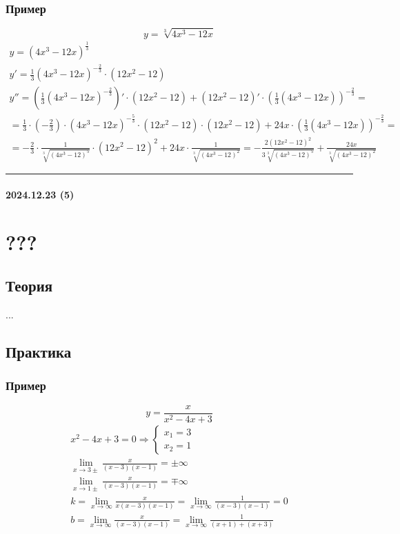 \documentclass{article}
\begin{document}
\subsubsection{Пример}
\[
    y = \sqrt[3]{4x^3 - 12x}
\]
\begin{gather*}
    y = (4x^3 - 12x)^{\frac{1}{3}} \\
    y' = \frac{1}{3} (4x^3 - 12x)^{-\frac{2}{3}} \cdot (12x^2 - 12) \\
    y'' = \left(\frac{1}{3} (4x^3 - 12x)^{-\frac{2}{3}}\right)' \cdot (12x^2 - 12) + 
    (12x^2 - 12)' \cdot \left(\frac{1}{3} (4x^3 - 12x)\right)^{-\frac{2}{3}} = \\
    = \frac{1}{3} \cdot \left( -\frac{2}{3} \right) \cdot (4x^3 - 12x)^{-\frac{5}{3}} \cdot (12x^2 - 12) \cdot (12x^2 - 12) +
    24x \cdot \left(\frac{1}{3} (4x^3 - 12x)\right)^{-\frac{2}{3}} = \\
    = -\frac{2}{3} \cdot \frac{1}{\sqrt[3]{(4x^3 - 12)^5}} \cdot (12x^2 - 12)^2 + 24x \cdot \frac{1}{\sqrt[3]{(4x^3 - 12)^2}} =
    -\frac{2(12x^2 - 12)^2}{3\sqrt[3]{(4x^3 - 12)^5}} + \frac{24x}{\sqrt[3]{(4x^3 - 12)^2}}
\end{gather*}



\par\noindent\rule{\textwidth}{1pt}
\paragraph{2024.12.23 (5)}
\section{???}

\subsection{Теория}
...

\subsection{Практика}

\subsubsection{Пример}
\[
    y = \frac{x}{x^2 - 4x + 3}
\]
\begin{gather*}
    x^2 - 4x + 3 = 0 \Rightarrow
    \begin{cases}
        x_1 = 3 \\
        x_2 = 1
    \end{cases} \\
    \lim_{x \to 3\pm} \frac{x}{(x - 3)(x - 1)} = \pm \infty \\
    \lim_{x \to 1\pm} \frac{x}{(x - 3)(x - 1)} = \mp \infty \\
    k = \lim_{x \to \infty} \frac{x}{x(x - 3)(x - 1)} = \lim_{x \to \infty} \frac{1}{(x - 3)(x - 1)} = 0 \\
    b = \lim_{x \to \infty} \frac{x}{(x - 3)(x - 1)} = \lim_{x \to \infty} \frac{1}{(x + 1) + (x + 3)}
\end{gather*}
\end{document}
